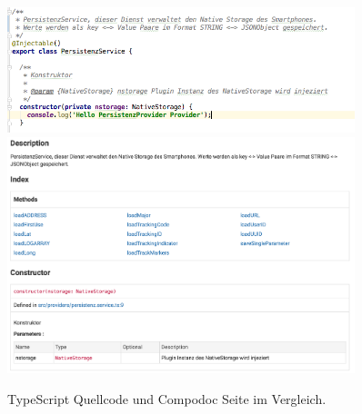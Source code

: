 \begin{figure}[htbp] 
	\centering
	\includegraphics[width=0.9\textwidth]{images/composource.png} 
	\includegraphics[width=0.9\textwidth]{images/compoergebnis.png}
	\caption{TypeScript Quellcode und Compodoc Seite im Vergleich.}
	\label{fig:JSDemo}
\end{figure}
